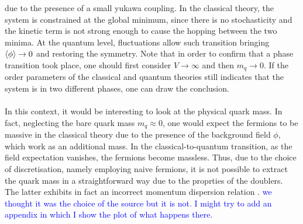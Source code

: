 due to the presence of a small yukawa coupling. In the classical theory, the system is constrained at the global minimum, since there is no stochasticity and the kinetic term is not strong enough to cause the hopping between the two minima. At the quantum level, fluctuations allow such transition bringing $\left\langle \phi \right\rangle \to 0$ and restoring the symmetry.
Note that in order to confirm that a phase transition took place, one should first consider $V \to \infty$ and then $m_q \to 0$. If the order parameters of the classical and quantum theories still indicates that the system is 
in two different phases, one can draw the conclusion. \\~\\
In this context, it would be interesting to look at the physical quark mass. In fact, neglecting the bare quark mass $m_q \approx 0$, one would expect the fermions to be massive in the classical theory due to the presence of the background field $\phi$, which work as an additional mass. In the classical-to-quantum transition, as the field expectation vanishes, the 
fermions become massless. Thus, due to the choice of discretisation, namely employing naive fermions, it is not possible to extract the quark mass in a straightforward way due to the proprties of the doublers. The latter exhibits in fact an incorrect momentum dispersion relation \cite{COHEN1983102,PhysRevD.101.094512}. \textcolor{blue}{we thought it was the choice of the source but it is not. I might try to add an appendix in which I show the plot of what happens there.}

\newpage

